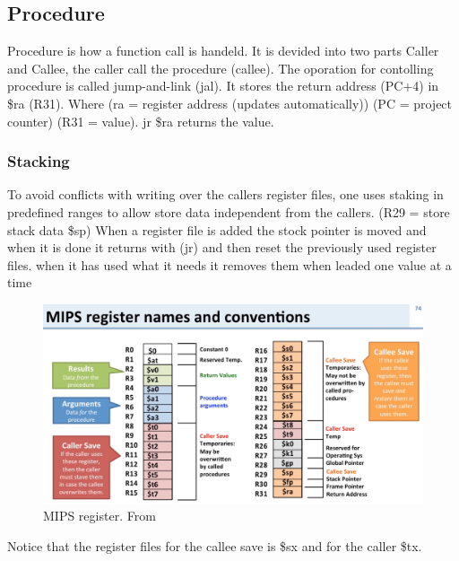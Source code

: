 \subsection{Procedure}
Procedure is how a function call is handeld. It is devided into two parts Caller and Callee,
the caller call the procedure (callee).
The oporation for contolling procedure is called jump-and-link (jal).
It stores the return address (PC+4) in \$ra (R31).
Where (ra = register address (updates automatically))
(PC = project counter)
(R31 = value).
jr \$ra returns the value.

\subsubsection{Stacking}
To avoid conflicts with writing over the callers register files, one uses staking in predefined
ranges to allow store data independent from the callers. 
(R29 =  store stack data \$sp)
When a register file is added the stock pointer is moved and when it is done it returns with (jr) and then
reset the previously used register files.
when it has used what it needs it removes them when leaded one value at a time

\begin{figure}[H]
    \centering
    \includegraphics[width=14cm]{image/mips-register.png} 
    \caption{MIPS register. From \cite{ca}}
\end{figure}

Notice that the register files for the callee save is \$sx and for the caller \$tx.

